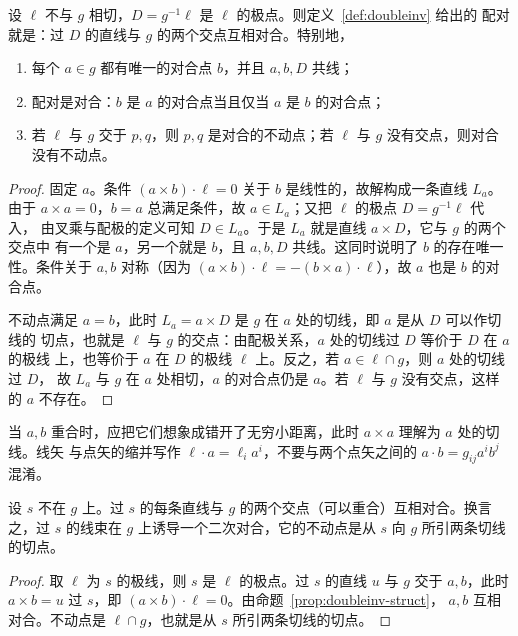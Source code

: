 \begin{proposition}[二次对合的结构]\label{prop:doubleinv-struct}
设 $\ell$ 不与 $g$ 相切，$D=g^{-1}\ell$ 是 $\ell$ 的极点。则定义~\ref{def:doubleinv} 给出的
配对就是：过 $D$ 的直线与 $g$ 的两个交点互相对合。特别地，
\begin{enumerate}
\item 每个 $a\in g$ 都有唯一的对合点 $b$，并且 $a,b,D$ 共线；
\item 配对是对合：$b$ 是 $a$ 的对合点当且仅当 $a$ 是 $b$ 的对合点；
\item 若 $\ell$ 与 $g$ 交于 $p,q$，则 $p,q$ 是对合的不动点；若 $\ell$ 与 $g$ 没有交点，则对合
没有不动点。
\end{enumerate}
\end{proposition}

\begin{proof}
固定 $a$。条件 $(a\times b)\cdot\ell=0$ 关于 $b$ 是线性的，故解构成一条直线 $L_a$。由于
$a\times a=0$，$b=a$ 总满足条件，故 $a\in L_a$；又把 $\ell$ 的极点 $D=g^{-1}\ell$ 代入，
由叉乘与配极的定义可知 $D\in L_a$。于是 $L_a$ 就是直线 $a\times D$，它与 $g$ 的两个交点中
有一个是 $a$，另一个就是 $b$，且 $a,b,D$ 共线。这同时说明了 $b$ 的存在唯一性。条件关于
$a,b$ 对称（因为 $(a\times b)\cdot\ell=-(b\times a)\cdot\ell$），故 $a$ 也是 $b$ 的对合点。

不动点满足 $a=b$，此时 $L_a=a\times D$ 是 $g$ 在 $a$ 处的切线，即 $a$ 是从 $D$ 可以作切线的
切点，也就是 $\ell$ 与 $g$ 的交点：由配极关系，$a$ 处的切线过 $D$ 等价于 $D$ 在 $a$ 的极线
上，也等价于 $a$ 在 $D$ 的极线 $\ell$ 上。反之，若 $a\in\ell\cap g$，则 $a$ 处的切线过 $D$，
故 $L_a$ 与 $g$ 在 $a$ 处相切，$a$ 的对合点仍是 $a$。若 $\ell$ 与 $g$ 没有交点，这样的 $a$
不存在。
\end{proof}

\begin{remark}
当 $a,b$ 重合时，应把它们想象成错开了无穷小距离，此时 $a\times a$ 理解为 $a$ 处的切线。线矢
与点矢的缩并写作 $\ell\cdot a=\ell_ia^i$，不要与两个点矢之间的 $a\cdot b=g_{ij}a^ib^j$ 混淆。
\end{remark}

\begin{theorem}[过定点的线束给出的对合]\label{thm:pencil-inv}
设 $s$ 不在 $g$ 上。过 $s$ 的每条直线与 $g$ 的两个交点（可以重合）互相对合。换言之，过 $s$
的线束在 $g$ 上诱导一个二次对合，它的不动点是从 $s$ 向 $g$ 所引两条切线的切点。
\end{theorem}

\begin{proof}
取 $\ell$ 为 $s$ 的极线，则 $s$ 是 $\ell$ 的极点。过 $s$ 的直线 $u$ 与 $g$ 交于 $a,b$，此时
$a\times b=u$ 过 $s$，即 $(a\times b)\cdot\ell=0$。由命题~\ref{prop:doubleinv-struct}，
$a,b$ 互相对合。不动点是 $\ell\cap g$，也就是从 $s$ 所引两条切线的切点。
\end{proof}

